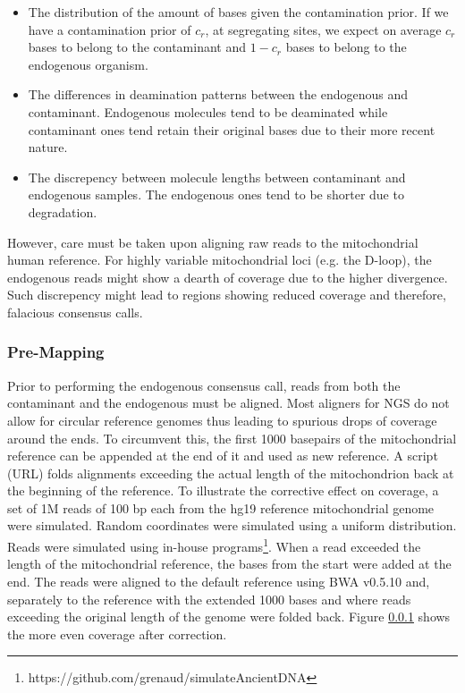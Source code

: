 \documentclass[a4paper,12pt]{article}
\begin{document}
\begin{itemize}
\item The distribution of the amount of bases given the contamination prior. If we have a contamination prior of $c_r$, at segregating sites, we expect on average $c_r$ bases to belong to the contaminant and $1-c_r$ bases to belong to the endogenous organism.
\item The differences in deamination patterns between the endogenous and contaminant. Endogenous molecules tend to be deaminated while contaminant ones tend retain their original bases due to their more recent nature. 
\item The discrepency between molecule lengths between contaminant and endogenous samples. The endogenous ones tend to be shorter due to degradation.
\end{itemize}

However, care must be taken upon aligning raw reads to the mitochondrial human reference. For highly variable mitochondrial loci (e.g. the D-loop), the endogenous reads might show a dearth of coverage due to the higher divergence. Such discrepency might lead to regions showing reduced coverage and therefore, falacious consensus calls.












\subsubsection{Pre-Mapping}


Prior to performing the endogenous consensus call, reads from both the contaminant and the endogenous must be aligned. Most aligners for NGS do not allow for circular reference genomes thus leading to spurious drops of coverage around the ends. To circumvent this, the first 1000 basepairs  of the mitochondrial reference can be appended at the end of it and used as new reference. A script (URL) folds alignments exceeding the actual length of the mitochondrion back at the beginning of the reference. To illustrate the corrective effect on coverage, a set of 1M reads of 100 bp each from the hg19 reference mitochondrial genome were simulated. Random coordinates were simulated using a uniform distribution. Reads were simulated using in-house programs\footnote{https://github.com/grenaud/simulateAncientDNA}. When a read exceeded the length of the mitochondrial reference, the bases from the start were added at the end. The reads were aligned to the default reference using BWA v0.5.10\cite{} and, separately to the reference with the extended 1000 bases and where reads exceeding the original length of the genome were folded back. Figure \ref{} shows the more even coverage after correction.
\end{document}
